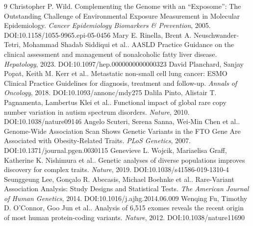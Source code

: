 \documentclass[11pt]{article}
\begin{document}
\begin{thebibliography}{9}
 Christopher P. Wild. Complementing the Genome with an “Exposome”: The Outstanding Challenge of Environmental Exposure Measurement in Molecular Epidemiology. \emph{Cancer Epidemiology Biomarkers \& Prevention}, 2005. DOI:10.1158/1055-9965.epi-05-0456
 Mary E. Rinella, Brent A. Neuschwander‐Tetri, Mohammad Shadab Siddiqui et al.. AASLD Practice Guidance on the clinical assessment and management of nonalcoholic fatty liver disease. \emph{Hepatology}, 2023. DOI:10.1097/hep.0000000000000323
 David Planchard, Sanjay Popat, Keith M. Kerr et al.. Metastatic non-small cell lung cancer: ESMO Clinical Practice Guidelines for diagnosis, treatment and follow-up. \emph{Annals of Oncology}, 2018. DOI:10.1093/annonc/mdy275
 Dalila Pinto, Alistair T. Pagnamenta, Lambertus Klei et al.. Functional impact of global rare copy number variation in autism spectrum disorders. \emph{Nature}, 2010. DOI:10.1038/nature09146
 Angelo Scuteri, Serena Sanna, Wei‐Min Chen et al.. Genome-Wide Association Scan Shows Genetic Variants in the FTO Gene Are Associated with Obesity-Related Traits. \emph{PLoS Genetics}, 2007. DOI:10.1371/journal.pgen.0030115
 Genevieve L. Wojcik, Mariaelisa Graff, Katherine K. Nishimura et al.. Genetic analyses of diverse populations improves discovery for complex traits. \emph{Nature}, 2019. DOI:10.1038/s41586-019-1310-4
 Seunggeung Lee, Gonçalo R. Abecasis, Michael Boehnke et al.. Rare-Variant Association Analysis: Study Designs and Statistical Tests. \emph{The American Journal of Human Genetics}, 2014. DOI:10.1016/j.ajhg.2014.06.009
 Wenqing Fu, Timothy D. O’Connor, Goo Jun et al.. Analysis of 6,515 exomes reveals the recent origin of most human protein-coding variants. \emph{Nature}, 2012. DOI:10.1038/nature11690
\end{thebibliography}
\end{document}
